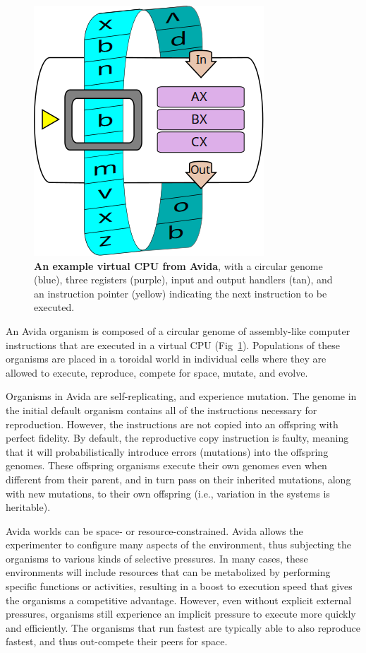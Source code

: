 \documentclass[10pt,letterpaper]{article}
\begin{document}
\begin{figure}[!h]
\includegraphics[width=0.5\columnwidth]{figures/methods/squishedCPU_extra.png}
\caption{{\bf An example virtual CPU from Avida}, with a circular genome (blue), three registers (purple), input and output handlers (tan), and an instruction pointer (yellow) indicating the next instruction to be executed.%
}\label{fig:cpu}
\end{figure}

An Avida organism is composed of a circular genome of assembly-like computer instructions that are executed in a virtual CPU (Fig~\ref{fig:cpu}). Populations of these organisms are placed in a toroidal world in individual cells where they are allowed to execute, reproduce, compete for space, mutate, and evolve.

Organisms in Avida are self-replicating, and experience mutation. The genome in the initial default organism contains all of the instructions necessary for reproduction. However, the instructions are not copied into an offspring with perfect fidelity. By default, the reproductive copy instruction is faulty, meaning that it will probabilistically introduce errors (mutations) into the offspring genomes. These offspring organisms execute their own genomes even when different from their parent, and in turn pass on their inherited mutations, along with new mutations, to their own offspring (i.e., variation in the systems is heritable).

Avida worlds can be space- or resource-constrained. Avida allows the experimenter to configure many aspects of the environment, thus subjecting the organisms to various kinds of selective pressures.  In many cases, these environments will include resources that can be metabolized by performing specific functions or activities, resulting in a boost to execution speed that gives the organisms a competitive advantage. However, even without explicit external pressures, organisms still experience an implicit pressure to execute more quickly and efficiently. The organisms that run fastest are typically able to also reproduce fastest, and thus out-compete their peers for space.
\end{document}
